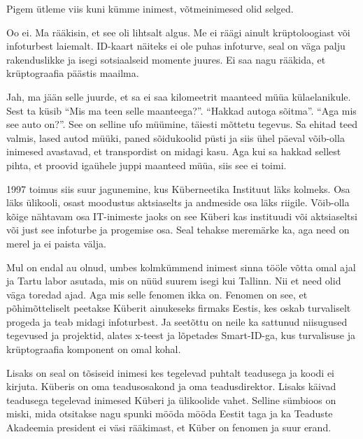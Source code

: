 Pigem ütleme viis kuni kümme inimest, võtmeinimesed olid selged.


Oo ei. Ma rääkisin, et see oli lihtsalt algus. Me ei räägi ainult krüptoloogiast või infoturbest laiemalt. ID-kaart näiteks ei ole  puhas infoturve, seal on väga palju rakenduslikke ja isegi sotsiaalseid  momente juures. Ei saa nagu rääkida, et krüptograafia päästis maailma. 


Jah, ma jään selle juurde, et sa ei saa kilomeetrit maanteed müüa külaelanikule. Sest ta küsib \enquote{Mis ma teen selle maanteega?}. \enquote{Hakkad autoga sõitma}. \enquote{Aga mis see auto on?}. See on selline ufo müümine, täiesti mõttetu tegevus. Sa ehitad teed valmis, lased autod müüki, paned sõidukoolid püsti ja siis ühel päeval võib-olla inimesed avastavad, et transpordist on midagi kasu. Aga kui sa hakkad sellest pihta, et proovid igaühele  juppi maanteed müüa, siis see ei toimi. 


1997 toimus siis suur jagunemine, kus Küberneetika Instituut läks kolmeks. Osa läks ülikooli, osast moodustus aktsiaselts ja andmeside osa läks  riigile. Võib-olla kõige nähtavam osa IT-inimeste jaoks on see Küberi kas instituudi või aktsiaseltsi või just see infoturbe ja progemise osa. Seal tehakse meremärke ka, aga need on merel ja ei paista välja.

Mul on endal au olnud, umbes kolmkümmend inimest sinna tööle võtta omal ajal ja Tartu labor asutada, mis on nüüd suurem isegi kui Tallinn. Nii et need olid väga toredad ajad. Aga mis selle fenomen ikka on. Fenomen on see, et põhimõtteliselt peetakse Küberit ainukeseks firmaks Eestis, kes oskab turvaliselt progeda ja teab midagi infoturbest. Ja seetõttu on neile ka sattunud niisugused tegevused ja projektid,  alates x-teest ja lõpetades Smart-ID-ga, kus  turvalisuse ja krüptograafia komponent on omal kohal. 

Lisaks on seal on tõsiseid inimesi kes tegelevad puhtalt teadusega ja koodi ei kirjuta. Küberis on oma teadusosakond  ja oma teadusdirektor. Lisaks käivad teadusega tegelevad inimesed Küberi ja ülikoolide vahet. Selline sümbioos on miski, mida otsitakse nagu spunki mööda mööda Eestit taga ja ka Teaduste Akadeemia president ei väsi rääkimast, et Küber on fenomen ja suur erand. 

